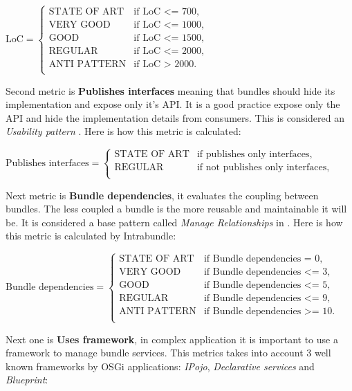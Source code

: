 \(\text{LoC}=\begin{cases}
\text{STATE OF ART}& \text{if LoC <= 700},\\
\text{VERY GOOD}& \text{if LoC <= 1000}, \\
\text{GOOD}& \text{if LoC <= 1500}, \\
\text{REGULAR}& \text{if LoC <= 2000}, \\
\text{ANTI PATTERN}& \text{if LoC > 2000}. \\
\end{cases} \)\newline  

Second metric is \textbf{Publishes interfaces} meaning that bundles should hide its implementation and expose only it's API. It is a good practice expose only the API and hide the implementation details from consumers. This is considered an \emph{Usability pattern} \citep{Knoernschild 2012}. Here is how this metric is calculated:\newline

\(\text{Publishes interfaces}=\begin{cases}
\text{STATE OF ART}& \text{if publishes only interfaces},\\
\text{REGULAR}& \text{if not publishes only interfaces}, \\
\end{cases} \)  \newline

Next metric is \textbf{Bundle dependencies}, it evaluates the coupling between bundles. The less coupled a bundle is the more reusable and maintainable it will be. It is considered a base pattern called \emph{Manage Relationships} in \citep{Knoernschild 2012}. Here is how this metric is calculated by Intrabundle:\newline


\(\text{Bundle dependencies}=\begin{cases}
\text{STATE OF ART}& \text{if Bundle dependencies = 0},\\
\text{VERY GOOD}& \text{if Bundle dependencies <= 3}, \\
\text{GOOD}& \text{if Bundle dependencies <= 5}, \\
\text{REGULAR}& \text{if Bundle dependencies <= 9}, \\
\text{ANTI PATTERN}& \text{if Bundle dependencies >= 10}. \\
\end{cases} \)\newline 

Next one is \textbf{Uses framework}, in complex application it is important to use a framework to manage bundle services. This metrics takes into account 3 well known frameworks by OSGi applications: \emph{IPojo}, \emph{Declarative services} and \emph{Blueprint}: \newline

